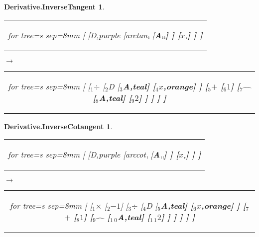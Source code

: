 \documentclass[UTF8,10pt]{ctexart}
\newcommand{\Bigskip}{\bigskip\medskip}
\newcommand{\subtreeA}{\bf A}
\newcommand{\I}{$_{\scriptscriptstyle 1}$}
\newcommand{\II}{$_{\scriptscriptstyle 2}$}
\newcommand{\III}{$_{\scriptscriptstyle 3}$}
\newcommand{\IV}{$_{\scriptscriptstyle 4}$}
\newcommand{\V}{$_{\scriptscriptstyle 5}$}
\newcommand{\VI}{$_{\scriptscriptstyle 6}$}
\newcommand{\VII}{$_{\scriptscriptstyle 7}$}
\newcommand{\VIII}{$_{\scriptscriptstyle 8}$}
\newcommand{\IX}{$_{\scriptscriptstyle 9}$}
\newcommand{\X}{$_{\scriptscriptstyle 1\:\!\!0}$}
\newcommand{\XI}{$_{\scriptscriptstyle 1\:\!\!1}$}
\newcommand{\lc}{$_{\:\!\scriptscriptstyle\rm l\!}$}
\newcommand{\rc}{$_{\:\!\scriptscriptstyle\rm r\!}$}
\newcommand{\Derivative}{\rm D}
\newcommand{\x}{$x$}
\newcommand{\One}{$1$}
\newcommand{\NegativeOne}{$-1$}
\newcommand{\Two}{$2$}
\newcommand{\Addition}{$+$}
\newcommand{\Multiplication}{$\times$}
\newcommand{\Division}{$\div$}
\newcommand{\Power}{$\hat{\quad}$}
\newcommand{\InverseTangent}{\rm arctan}
\newcommand{\InverseCotangent}{\rm arccot}
\newtheorem*{Derivative.InverseTangent}{\bf Derivative.InverseTangent }
\newtheorem*{Derivative.InverseCotangent}{\bf Derivative.InverseCotangent }
\begin{document}
	\newpage

	\begin{center}\vspace*{\fill}
		\begin{Derivative.InverseTangent}
			\qquad\par\Bigskip
			\begin{tabular}{c}
				\begin{forest}
					for tree={s sep=8mm}
					[
						[\Derivative,purple
							[\InverseTangent\lc
								[\subtreeA\lc\lc]
							]
							[\x\rc]
						]
					]
				\end{forest}
			\end{tabular}
			\qquad
			$\longrightarrow$
			\qquad
			\begin{tabular}{c}
				\begin{forest}
					for tree={s sep=8mm}
					[
						[\I\Division
							[\II\Derivative
								[\III\subtreeA,teal]
								[\IV\x,orange]
							]
							[\V\Addition
								[\VI\One]
								[\VII\Power
									[\VIII\subtreeA,teal]
									[\IX\Two]
								]
							]
						]
					]
				\end{forest}
			\end{tabular}
		\end{Derivative.InverseTangent}
		\begin{Derivative.InverseCotangent}
			\qquad\par\Bigskip
			\begin{tabular}{c}
				\begin{forest}
					for tree={s sep=8mm}
					[
						[\Derivative,purple
							[\InverseCotangent\lc
								[\subtreeA\lc\lc]
							]
							[\x\rc]
						]
					]
				\end{forest}
			\end{tabular}
			\qquad
			$\longrightarrow$
			\qquad
			\begin{tabular}{c}
				\begin{forest}
					for tree={s sep=8mm}
					[
						[\I\Multiplication
							[\II\NegativeOne]
							[\III\Division
								[\IV\Derivative
									[\V\subtreeA,teal]
									[\VI\x,orange]
								]
								[\VII\Addition
									[\VIII\One]
									[\IX\Power
										[\X\subtreeA,teal]
										[\XI\Two]
									]
								]
							]
						]
					]
				\end{forest}
			\end{tabular}
		\end{Derivative.InverseCotangent}
	\vspace*{\fill}\end{center}
\end{document}
